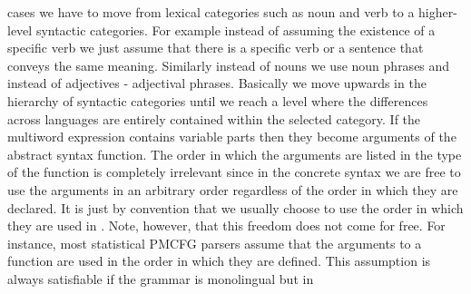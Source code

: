 \documentclass[output=paper]{LSP/langsci}
\begin{document}
cases\ili{} we\ili{} have\ili{} to\ili{} move\ili{} from\ili{} lexical\ili{} categories\ili{} such\ili{} as\ili{} noun\ili{} and\ili{} verb\ili{}
to\ili{} a\ili{} higher\ili{}-level\ili{} syntactic\ili{} categories\ili{}.\ili{} For\ili{} example\ili{} instead\ili{} of\ili{} assuming\ili{}
the\ili{} existence\ili{} of\ili{} a\ili{} specific\ili{} verb\ili{} we\ili{} just\ili{} assume\ili{} that\ili{} there\ili{} is\ili{} a\ili{} specific\ili{}
verb\ili{} \ili{}\isi{}\ili{} or\ili{} a\ili{} sentence\ili{} that\ili{} conveys\ili{} the\ili{} same\ili{} meaning\ili{}.\ili{} Similarly\ili{}
instead\ili{} of\ili{} nouns\ili{} we\ili{} use\ili{} noun\ili{} phrases\ili{} and\ili{} instead\ili{} of\ili{} adjectives\ili{} \ili{}-\ili{} adjectival\ili{} phrases\ili{}.\ili{}
Basically\ili{} we\ili{} move\ili{} upwards\ili{} in\ili{} the\ili{} hierarchy\ili{} of\ili{} syntactic\ili{} categories\ili{} until\ili{}
we\ili{} reach\ili{} a\ili{} level\ili{} where\ili{} the\ili{} differences\ili{} across\ili{} languages\ili{} are\ili{} entirely\ili{}
contained\ili{} within\ili{} the\ili{} selected\ili{} category\ili{}.\ili{} \ili{}
\ili{}
If\ili{} the\ili{} multiword\ili{} expression\ili{}
contains\ili{} variable\ili{} parts\ili{} then\ili{} they\ili{} become\ili{} arguments\ili{} of\ili{} the\ili{} abstract\ili{}
syntax\ili{} function\ili{}.\ili{} The\ili{} order\ili{} in\ili{} which\ili{} the\ili{} arguments\ili{} are\ili{} listed\ili{} in\ili{} the\ili{}
type\ili{} of\ili{} the\ili{} function\ili{} is\ili{} completely\ili{} irrelevant\ili{} since\ili{} in\ili{} the\ili{} concrete\ili{}
syntax\ili{} we\ili{} are\ili{} free\ili{} to\ili{} use\ili{} the\ili{} arguments\ili{} in\ili{} an\ili{} arbitrary\ili{} order\ili{} regardless\ili{} \ili{}
of\ili{} the\ili{} order\ili{} in\ili{} which\ili{} they\ili{} are\ili{} declared\ili{}.\ili{} It\ili{} is\ili{} just\ili{} by\ili{} convention\ili{} that\ili{}
we\ili{} usually\ili{} choose\ili{} to\ili{} use\ili{} the\ili{} order\ili{} in\ili{} which\ili{} they\ili{} are\ili{} used\ili{} in\ili{} \ili{}\ili{}\ili{}.\ili{}
Note\ili{},\ili{} however\ili{},\ili{} that\ili{} this\ili{} freedom\ili{} does\ili{} not\ili{} come\ili{} for\ili{} free\ili{}.\ili{} \ili{}
For\ili{} instance\ili{},\ili{} most\ili{} statistical\ili{} PMCFG\ili{} parsers\ili{} assume\ili{} that\ili{} \ili{}
the\ili{} arguments\ili{} to\ili{} a\ili{} function\ili{} are\ili{} used\ili{} in\ili{} the\ili{} order\ili{} in\ili{} which\ili{} they\ili{} are\ili{} defined\ili{}.\ili{}
This\ili{} assumption\ili{} is\ili{} always\ili{} satisfiable\ili{} if\ili{} the\ili{} grammar\ili{} is\ili{} monolingual\ili{} but\ili{} in\ili{} \ili{}
\end{document}
